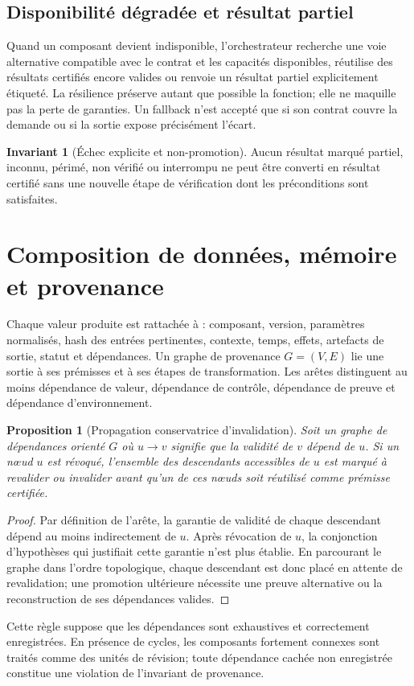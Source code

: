 \documentclass[11pt,a4paper]{article}
\theoremstyle{definition}
\newtheorem{invariant}[definition]{Invariant}
\theoremstyle{plain}
\newtheorem{proposition}[definition]{Proposition}
\theoremstyle{remark}
\begin{document}
\subsection{Disponibilité dégradée et résultat partiel}
Quand un composant devient indisponible, l'orchestrateur recherche une voie alternative compatible avec le contrat et les capacités disponibles, réutilise des résultats certifiés encore valides ou renvoie un résultat partiel explicitement étiqueté. La résilience préserve autant que possible la fonction; elle ne maquille pas la perte de garanties. Un fallback n'est accepté que si son contrat couvre la demande ou si la sortie expose précisément l'écart.

\begin{invariant}[Échec explicite et non-promotion]
Aucun résultat marqué partiel, inconnu, périmé, non vérifié ou interrompu ne peut être converti en résultat certifié sans une nouvelle étape de vérification dont les préconditions sont satisfaites.
\end{invariant}

\section{Composition de données, mémoire et provenance}
Chaque valeur produite est rattachée à : composant, version, paramètres normalisés, hash des entrées pertinentes, contexte, temps, effets, artefacts de sortie, statut et dépendances. Un graphe de provenance $G=(V,E)$ lie une sortie à ses prémisses et à ses étapes de transformation. Les arêtes distinguent au moins dépendance de valeur, dépendance de contrôle, dépendance de preuve et dépendance d'environnement.

\begin{proposition}[Propagation conservatrice d'invalidation]
Soit un graphe de dépendances orienté $G$ où $u\to v$ signifie que la validité de $v$ dépend de $u$. Si un nœud $u$ est révoqué, l'ensemble des descendants accessibles de $u$ est marqué à revalider ou invalider avant qu'un de ces nœuds soit réutilisé comme prémisse certifiée.
\end{proposition}
\begin{proof}
Par définition de l'arête, la garantie de validité de chaque descendant dépend au moins indirectement de $u$. Après révocation de $u$, la conjonction d'hypothèses qui justifiait cette garantie n'est plus établie. En parcourant le graphe dans l'ordre topologique, chaque descendant est donc placé en attente de revalidation; une promotion ultérieure nécessite une preuve alternative ou la reconstruction de ses dépendances valides.
\end{proof}
Cette règle suppose que les dépendances sont exhaustives et correctement enregistrées. En présence de cycles, les composants fortement connexes sont traités comme des unités de révision; toute dépendance cachée non enregistrée constitue une violation de l'invariant de provenance.
\end{document}
